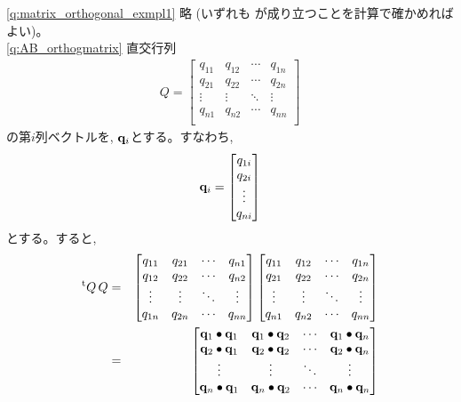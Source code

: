 \ref{q:matrix_orthogonal_exmpl1} 略 (いずれも
が成り立つことを計算で確かめればよい)。\\

\ref{q:AB_orthogmatrix} 直交行列
\begin{eqnarray*}
Q=\begin{bmatrix}
q_{11} & q_{12} & \cdots & q_{1n}\\
q_{21} & q_{22} & \cdots & q_{2n}\\
\vdots & \vdots & \ddots & \vdots\\
q_{n1} & q_{n2} & \cdots & q_{nn}\\
\end{bmatrix}
\end{eqnarray*}
の第$i$列ベクトルを, ${\bf q}_i$とする。すなわち, 
\begin{eqnarray*}
{\bf q}_i=\begin{bmatrix}
q_{1i}\\
q_{2i}\\
\vdots\\
q_{ni}\\
\end{bmatrix}
\end{eqnarray*}
とする。すると, 
\begin{eqnarray}
^{\text t}Q\,Q&=&
\begin{bmatrix}
q_{11} & q_{21} & \cdots & q_{n1}\\
q_{12} & q_{22} & \cdots & q_{n2}\\
\vdots & \vdots & \ddots & \vdots\\
q_{1n} & q_{2n} & \cdots & q_{nn}\\
\end{bmatrix}
\begin{bmatrix}
q_{11} & q_{12} & \cdots & q_{1n}\\
q_{21} & q_{22} & \cdots & q_{2n}\\
\vdots & \vdots & \ddots & \vdots\\
q_{n1} & q_{n2} & \cdots & q_{nn}\\
\end{bmatrix}\nonumber\\
&=&
\begin{bmatrix}
{\bf q}_1\bullet{\bf q}_1 & {\bf q}_1\bullet{\bf q}_2 & \cdots & {\bf q}_1\bullet{\bf q}_n\\
{\bf q}_2\bullet{\bf q}_1 & {\bf q}_2\bullet{\bf q}_2 & \cdots & {\bf q}_2\bullet{\bf q}_n\\
\vdots & \vdots & \ddots & \vdots\\
{\bf q}_n\bullet{\bf q}_1 & {\bf q}_n\bullet{\bf q}_2 & \cdots & {\bf q}_n\bullet{\bf q}_n\\
\end{bmatrix}\label{eq:AB_orthogmatrix_ans4}
\end{eqnarray}
